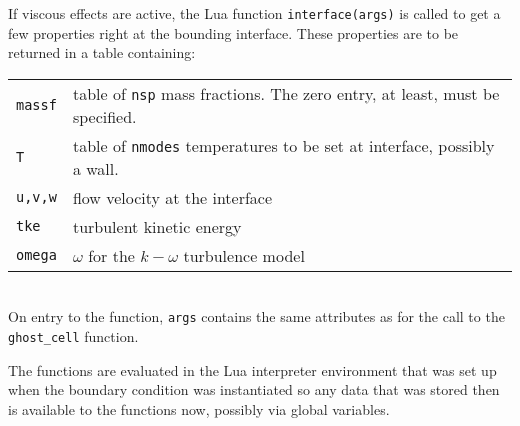 \medskip
If viscous effects are active, the Lua function \texttt{interface(args)} is called to
get a few properties right at the bounding interface.
These properties are to be returned in a table containing:\\
\begin{tabular}{lp{12cm}}
 \texttt{massf} & table of \texttt{nsp} mass fractions. The zero entry, at least, must be specified. \\
 \texttt{T} & table of \texttt{nmodes} temperatures to be set at interface, possibly a wall.\\
 \texttt{u,v,w} & flow velocity at the interface \\
 \texttt{tke} &  turbulent kinetic energy \\
 \texttt{omega} &  $\omega$ for the $k-\omega$ turbulence model \\
\end{tabular}\\
On entry to the function, \texttt{args} contains the same attributes as for the call
to the \texttt{ghost\_cell} function.

\medskip
The functions are evaluated in the Lua interpreter environment that was set up
when the boundary condition was instantiated so any data that was stored then is
available to the functions now, possibly via global variables.

